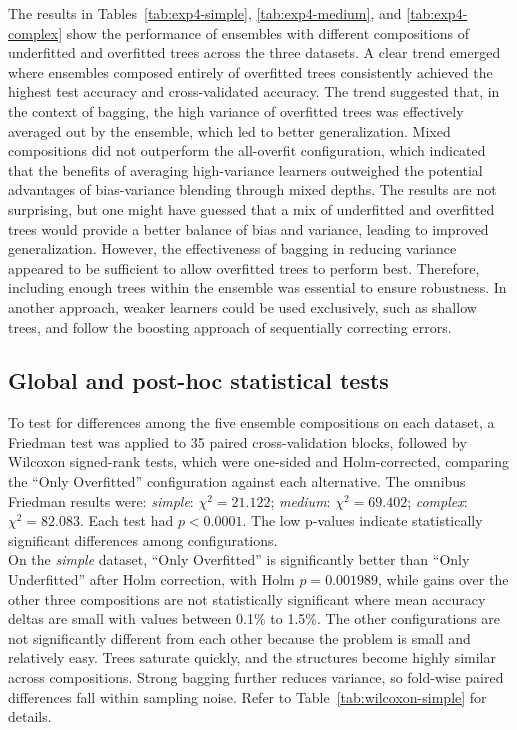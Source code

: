 \documentclass[conference]{IEEEtran}
\begin{document}
 The results in Tables~\ref{tab:exp4-simple}, \ref{tab:exp4-medium}, and \ref{tab:exp4-complex} show the performance of ensembles with different compositions of underfitted and overfitted trees across the three datasets. A clear trend emerged where ensembles composed entirely of overfitted trees consistently achieved the highest test accuracy and cross-validated accuracy. The trend suggested that, in the context of bagging, the high variance of overfitted trees was effectively averaged out by the ensemble, which led to better generalization. Mixed compositions did not outperform the all-overfit configuration, which indicated that the benefits of averaging high-variance learners outweighed the potential advantages of bias-variance blending through mixed depths. The results are not surprising, but one might have guessed that a mix of underfitted and overfitted trees would provide a better balance of bias and variance, leading to improved generalization. However, the effectiveness of bagging in reducing variance appeared to be sufficient to allow overfitted trees to perform best. Therefore, including enough trees within the ensemble was essential to ensure robustness. In another approach, weaker learners could be used exclusively, such as shallow trees, and follow the boosting approach of sequentially correcting errors. 

 \subsection{Global and post-hoc statistical tests}
To test for differences among the five ensemble compositions on each dataset, a Friedman test was applied to 35 paired cross-validation blocks, followed by Wilcoxon signed-rank tests, which were one-sided and Holm-corrected, comparing the ``Only Overfitted'' configuration against each alternative. The omnibus Friedman results were: \textit{simple}: $\chi^2=21.122$; \textit{medium}: $\chi^2=69.402$; \textit{complex}: $\chi^2=82.083$. Each test had $p<0.0001$. The low p-values indicate statistically significant differences among configurations.\\

 On the \textit{simple} dataset, ``Only Overfitted'' is significantly better than ``Only Underfitted'' after Holm correction, with Holm $p=0.001989$, while gains over the other three compositions are not statistically significant where mean accuracy deltas are small with values between 0.1\% to 1.5\%. The other configurations are not significantly different from each other because the problem is small and relatively easy. Trees saturate quickly, and the structures become highly similar across compositions. Strong bagging further reduces variance, so fold-wise paired differences fall within sampling noise. Refer to Table~\ref{tab:wilcoxon-simple} for details.\\
\end{document}
